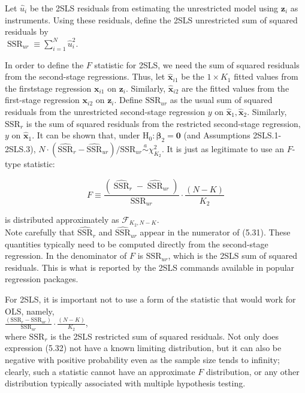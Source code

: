 \documentclass[10pt]{article}
\begin{document}
Let $\hat{u}_{i}$ be the 2SLS residuals from estimating the unrestricted model using $\mathbf{z}_{i}$ as instruments. Using these residuals, define the 2SLS unrestricted sum of squared residuals by\\
$\operatorname{SSR}_{u r} \equiv \sum_{i=1}^{N} \hat{u}_{i}^{2}$.

In order to define the $F$ statistic for 2SLS, we need the sum of squared residuals from the second-stage regressions. Thus, let $\hat{\mathbf{x}}_{i 1}$ be the $1 \times K_{1}$ fitted values from the firststage regression $\mathbf{x}_{i 1}$ on $\mathbf{z}_{i}$. Similarly, $\hat{\mathbf{x}}_{i 2}$ are the fitted values from the first-stage regression $\mathbf{x}_{i 2}$ on $\mathbf{z}_{i}$. Define $\mathrm{SSR}_{u r}$ as the usual sum of squared residuals from the unrestricted second-stage regression $y$ on $\hat{\mathbf{x}}_{1}, \hat{\mathbf{x}}_{2}$. Similarly, $\mathrm{SSR}_{r}$ is the sum of squared residuals from the restricted second-stage regression, $y$ on $\hat{\mathbf{x}}_{1}$. It can be shown that, under $\mathrm{H}_{0}: \boldsymbol{\beta}_{2}=\mathbf{0}$ (and Assumptions 2SLS.1-2SLS.3), $N \cdot\left(\widehat{\mathrm{SSR}}_{r}-\widehat{\mathrm{SSR}}_{u r}\right) / \mathrm{SSR}_{u r} \stackrel{a}{\sim} \chi_{K_{2}}^{2}$. It is just as legitimate to use an $F$-type statistic:


\begin{equation*}
F \equiv \frac{\left(\widehat{\operatorname{SSR}}_{r}-\widehat{\operatorname{SSR}}_{u r}\right)}{\operatorname{SSR}_{u r}} \cdot \frac{(N-K)}{K_{2}} \tag{5.31}
\end{equation*}


is distributed approximately as $\mathscr{F}_{K_{2}, N-K}$.\\
Note carefully that $\widehat{\mathrm{SSR}}_{r}$ and $\widehat{\mathrm{SSR}}_{u r}$ appear in the numerator of (5.31). These quantities typically need to be computed directly from the second-stage regression. In the denominator of $F$ is $\mathrm{SSR}_{u r}$, which is the 2SLS sum of squared residuals. This is what is reported by the 2SLS commands available in popular regression packages.

For 2SLS, it is important not to use a form of the statistic that would work for OLS, namely,\\
$\frac{\left(\mathrm{SSR}_{r}-\mathrm{SSR}_{u r}\right)}{\mathrm{SSR}_{u r}} \cdot \frac{(N-K)}{K_{2}}$,\\
where $\mathrm{SSR}_{r}$ is the 2SLS restricted sum of squared residuals. Not only does expression (5.32) not have a known limiting distribution, but it can also be negative with positive probability even as the sample size tends to infinity; clearly, such a statistic cannot have an approximate $F$ distribution, or any other distribution typically associated with multiple hypothesis testing.
\end{document}
